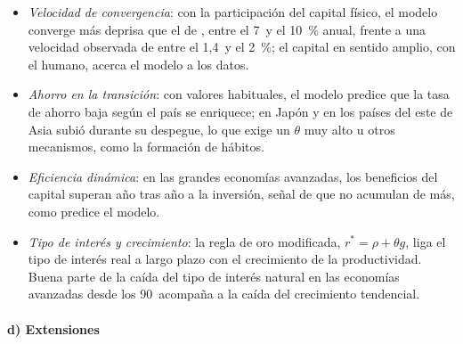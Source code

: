 \documentclass[11pt]{article}
\begin{document}
\begin{itemize}
\item \emph{Velocidad de convergencia}: con la participación del capital físico, el modelo converge más deprisa que el de , entre el 7~y el 10~\% anual, frente a una velocidad observada de entre el 1,4~y el 2~\%\nocite{MankiwRomerWeil1992}; el capital en sentido amplio, con el humano, acerca el modelo a los datos\nocite{BarroSalaiMartin2004}.
\item \emph{Ahorro en la transición}: con valores habituales, el modelo predice que la tasa de ahorro baja según el país se enriquece; en Japón y en los países del este de Asia subió durante su despegue, lo que exige un $\theta$ muy alto u otros mecanismos, como la formación de hábitos\nocite{CarrollOverlandWeil2000Saving}.
\item \emph{Eficiencia dinámica}: en las grandes economías avanzadas, los beneficios del capital superan año tras año a la inversión, señal de que no acumulan de más\nocite{AbelEtAl1989Assessing}, como predice el modelo.
\item \emph{Tipo de interés y crecimiento}: la regla de oro modificada, $r^*=\rho+\theta g$, liga el tipo de interés real a largo plazo con el crecimiento de la productividad. Buena parte de la caída del tipo de interés natural en las economías avanzadas desde los 90~acompaña a la caída del crecimiento tendencial\nocite{HolstonLaubachWilliams2017Measuring}.
\end{itemize}

\paragraph{d) Extensiones}
\end{document}
